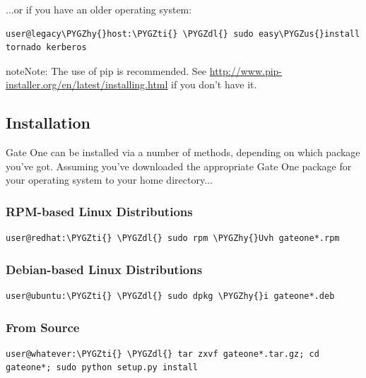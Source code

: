 \documentclass[letterpaper,10pt,openany]{sphinxmanual}
\def\PYGZus{\char`\_}
\def\PYGZdl{\char`\$}
\def\PYGZhy{\char`\-}
\def\PYGZti{\char`\~}
\begin{document}
...or if you have an older operating system:

\begin{Verbatim}[commandchars=\\\{\}]
user@legacy\PYGZhy{}host:\PYGZti{} \PYGZdl{} sudo easy\PYGZus{}install tornado kerberos
\end{Verbatim}

\begin{notice}{note}{Note:}
The use of pip is recommended.  See \href{http://www.pip-installer.org/en/latest/installing.html}{http://www.pip-installer.org/en/latest/installing.html} if you don't have it.
\end{notice}


\subsection{Installation}
\label{About/installation:installation}\label{About/installation::doc}
Gate One can be installed via a number of methods, depending on which package you've got.  Assuming you've downloaded the appropriate Gate One package for your operating system to your home directory...


\subsubsection{RPM-based Linux Distributions}
\label{About/installation:rpm-based-linux-distributions}
\begin{Verbatim}[commandchars=\\\{\}]
user@redhat:\PYGZti{} \PYGZdl{} sudo rpm \PYGZhy{}Uvh gateone*.rpm
\end{Verbatim}


\subsubsection{Debian-based Linux Distributions}
\label{About/installation:debian-based-linux-distributions}
\begin{Verbatim}[commandchars=\\\{\}]
user@ubuntu:\PYGZti{} \PYGZdl{} sudo dpkg \PYGZhy{}i gateone*.deb
\end{Verbatim}


\subsubsection{From Source}
\label{About/installation:from-source}
\begin{Verbatim}[commandchars=\\\{\}]
user@whatever:\PYGZti{} \PYGZdl{} tar zxvf gateone*.tar.gz; cd gateone*; sudo python setup.py install
\end{Verbatim}
\end{document}
